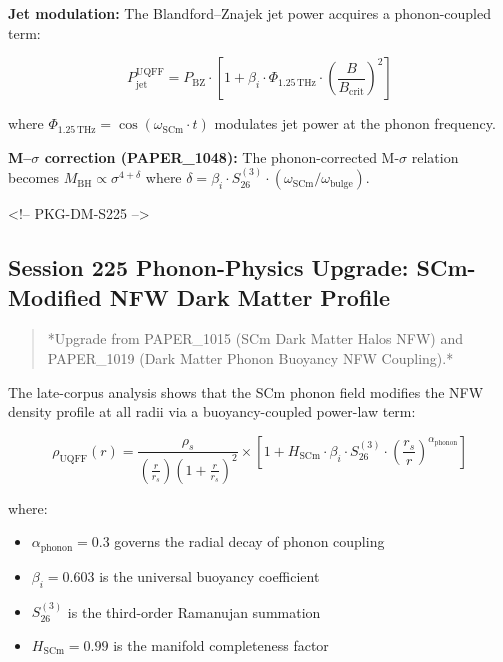 \documentclass[12pt,a4paper]{article}
\begin{document}
\textbf{Jet modulation:} The Blandford--Znajek jet power acquires a phonon-coupled term:

\begin{equation}
P_{\text{jet}}^{\text{UQFF}} = P_{\text{BZ}} \cdot \left[1 + \beta_i \cdot \Phi_{1.25\,\text{THz}} \cdot \left(\frac{B}{B_{\text{crit}}}\right)^2\right]
\end{equation}

where $\Phi_{1.25\,\text{THz}} = \cos(\omega_{\text{SCm}} \cdot t)$ modulates jet power at the phonon frequency.

\textbf{M--$\sigma$ correction (PAPER\_1048):} The phonon-corrected M-$\sigma$ relation becomes $M_{\text{BH}} \propto \sigma^{4+\delta}$ where $\delta = \beta_i \cdot S_{26}^{(3)} \cdot (\omega_{\text{SCm}}/\omega_{\text{bulge}})$.

<!-- PKG-DM-S225 -->

\subsection{Session 225 Phonon-Physics Upgrade: SCm-Modified NFW Dark Matter Profile}

\begin{quote}
*Upgrade from PAPER\_1015 (SCm Dark Matter Halos NFW) and PAPER\_1019
(Dark Matter Phonon Buoyancy NFW Coupling).*
\end{quote}

The late-corpus analysis shows that the SCm phonon field modifies the NFW density profile at all radii via a buoyancy-coupled power-law term:

\begin{equation}
\rho_{\text{UQFF}}(r) = \frac{\rho_s}{\left(\frac{r}{r_s}\right)\left(1+\frac{r}{r_s}\right)^2} \times \left[1 + H_{\text{SCm}} \cdot \beta_i \cdot S_{26}^{(3)} \cdot \left(\frac{r_s}{r}\right)^{\alpha_{\text{phonon}}}\right]
\end{equation}

where:

\begin{itemize}
  \item $\alpha_{\text{phonon}} = 0.3$ governs the radial decay of phonon coupling
  \item $\beta_i = 0.603$ is the universal buoyancy coefficient
  \item $S_{26}^{(3)}$ is the third-order Ramanujan summation
  \item $H_{\text{SCm}} = 0.99$ is the manifold completeness factor
\end{itemize}
\end{document}
